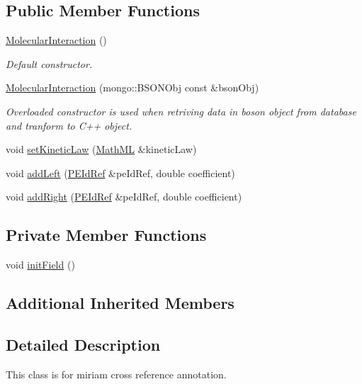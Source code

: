 \subsection*{Public Member Functions}
\begin{DoxyCompactItemize}
\item 
\hyperlink{classunisys_1_1MolecularInteraction_aacb66a56367fa5e3a95b140688f5f8a7}{Molecular\-Interaction} ()
\begin{DoxyCompactList}\small\item\em Default constructor. \end{DoxyCompactList}\item 
\hyperlink{classunisys_1_1MolecularInteraction_a085b8133090a289b2b2673ee79b8c754}{Molecular\-Interaction} (mongo\-::\-B\-S\-O\-N\-Obj const \&bson\-Obj)
\begin{DoxyCompactList}\small\item\em Overloaded constructor is used when retriving data in boson object from database and tranform to C++ object. \end{DoxyCompactList}\item 
void \hyperlink{classunisys_1_1MolecularInteraction_a8f03482d17171538122a10efa1601f9f}{set\-Kinetic\-Law} (\hyperlink{classunisys_1_1MathML}{Math\-M\-L} \&kinetic\-Law)
\item 
void \hyperlink{classunisys_1_1MolecularInteraction_ac45fdf2da80f5eb2cfa7d300b55c18db}{add\-Left} (\hyperlink{classunisys_1_1PEIdRef}{P\-E\-Id\-Ref} \&pe\-Id\-Ref, double coefficient)
\item 
void \hyperlink{classunisys_1_1MolecularInteraction_a59e2664203fcea4e9a1bf0ac5c8c75a1}{add\-Right} (\hyperlink{classunisys_1_1PEIdRef}{P\-E\-Id\-Ref} \&pe\-Id\-Ref, double coefficient)
\end{DoxyCompactItemize}
\subsection*{Private Member Functions}
\begin{DoxyCompactItemize}
\item 
void \hyperlink{classunisys_1_1MolecularInteraction_a6bae8353e2734eae8345228f7895665e}{init\-Field} ()
\end{DoxyCompactItemize}
\subsection*{Additional Inherited Members}


\subsection{Detailed Description}
This class is for miriam cross reference annotation. 

